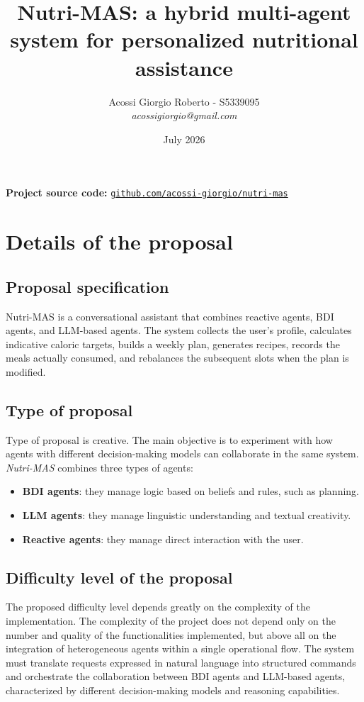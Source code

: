 \documentclass[12pt,a4paper]{article}
\begin{document}
\title{Nutri-MAS: a hybrid multi-agent system for personalized nutritional assistance}
\author{Acossi Giorgio Roberto - S5339095\\
{\em acossigiorgio@gmail.com}}
\date{July 2026}
\maketitle

\begin{center}
\textbf{Project source code:}
\href{https://github.com/acossi-giorgio/nutri-mas}{\texttt{github.com/acossi-giorgio/nutri-mas}}
\end{center}

\section{Details of the proposal}
\label{sec:yourProposal}

\subsection{Proposal specification}
\label{subsec:specification}

Nutri-MAS is a conversational assistant that combines reactive agents, BDI agents, and LLM-based agents. 
The system collects the user's profile, calculates indicative caloric targets, builds a weekly plan, 
generates recipes, records the meals actually consumed, and rebalances the subsequent slots when the plan is modified. 

\subsection{Type of proposal}
\label{subsec:kind}
Type of proposal is creative. The main objective is to experiment with how agents with different decision-making models can
collaborate in the same system. 
\emph{Nutri-MAS} combines three types of agents:
\begin{itemize}
    \item \textbf{BDI agents}: they manage logic based on beliefs and rules, such as planning.
    \item \textbf{LLM agents}: they manage linguistic understanding and textual creativity.
    \item \textbf{Reactive agents}: they manage direct interaction with the user.
\end{itemize}

\subsection{Difficulty level of the proposal}
\label{subsec:points}
The proposed difficulty level depends greatly on the complexity of the implementation.
The complexity of the project does not depend only on the number and quality of the functionalities
implemented, but above all on the integration of heterogeneous agents within
a single operational flow. The system must translate requests expressed in
natural language into structured commands and orchestrate the
collaboration between BDI agents and LLM-based agents, characterized by different
decision-making models and reasoning capabilities.
\end{document}

